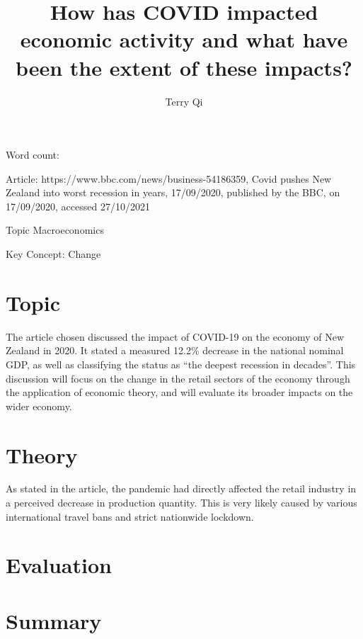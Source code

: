 \documentclass[a4paper,12pt]{article}
\title{How has COVID impacted economic activity and what have been the extent of these impacts?}
\author{Terry Qi}
\begin{document}
\maketitle
\newpage
Word count:

Article: https://www.bbc.com/news/business-54186359, Covid pushes New Zealand into worst recession in years, 17/09/2020, published by the BBC, on 17/09/2020, accessed 27/10/2021

Topic Macroeconomics

Key Concept: Change




\section*{Topic}
The article chosen discussed the impact of COVID-19 on the economy of New Zealand in 2020. It stated a measured 12.2\% decrease in the national nominal GDP, as well as classifying the status as ``the deepest recession in decades''. This discussion will focus on the change in the retail sectors of the economy through the application of economic theory, and will evaluate its broader impacts on the wider economy.

\section*{Theory}
As stated in the article, the pandemic had directly affected the retail industry in a perceived decrease in production quantity. This is very likely caused by various international travel bans and strict nationwide lockdown.


\section*{Evaluation}


\section*{Summary}

\end{document}
